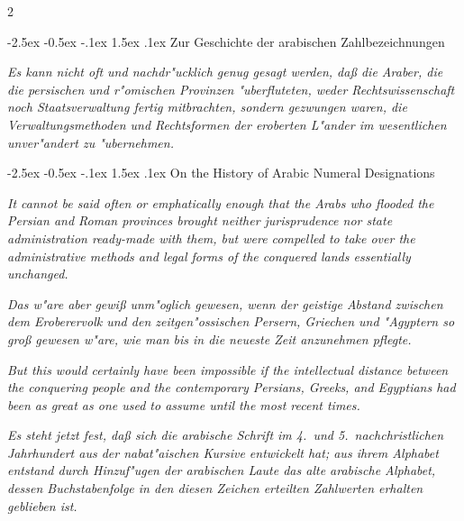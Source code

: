 \documentclass[10pt,a4paper]{article}
\makeatletter
\renewcommand{\section}{\@startsection{section}{1}{\z@}%
  {-2.5ex \@plus -0.5ex \@minus -.1ex}%
  {1.5ex \@plus .1ex}%
  {\normalfont\large\bfseries\color{sectioncolor}}}
\makeatother
\begin{document}
\clearpage

\begin{paracol}{2}

\section{Zur Geschichte der arabischen Zahlbezeichnungen}

\textit{Es kann nicht oft und nachdr"ucklich genug gesagt werden, da\ss{} die Araber, die die persischen und r"omischen Provinzen "uberfluteten, weder Rechtswissenschaft noch Staatsverwaltung fertig mitbrachten, sondern gezwungen waren, die Verwaltungsmethoden und Rechtsformen der eroberten L"ander im wesentlichen unver"andert zu "ubernehmen.}

\switchcolumn

\section{On the History of Arabic Numeral Designations}

\textit{It cannot be said often or emphatically enough that the Arabs who flooded the Persian and Roman provinces brought neither jurisprudence nor state administration ready-made with them, but were compelled to take over the administrative methods and legal forms of the conquered lands essentially unchanged.}

\switchcolumn*

\textit{Das w"are aber gewi\ss{} unm"oglich gewesen, wenn der geistige Abstand zwischen dem Eroberervolk und den zeitgen"ossischen Persern, Griechen und "Agyptern so gro\ss{} gewesen w"are, wie man bis in die neueste Zeit anzunehmen pflegte.}

\switchcolumn

\textit{But this would certainly have been impossible if the intellectual distance between the conquering people and the contemporary Persians, Greeks, and Egyptians had been as great as one used to assume until the most recent times.}

\switchcolumn*

\textit{Es steht jetzt fest, da\ss{} sich die arabische Schrift im 4.\ und 5.\ nachchristlichen Jahrhundert aus der nabat"aischen Kursive entwickelt hat; aus ihrem Alphabet entstand durch Hinzuf"ugen der arabischen Laute das alte arabische Alphabet, dessen Buchstabenfolge in den diesen Zeichen erteilten Zahlwerten erhalten geblieben ist.}


\end{paracol}
\end{document}
